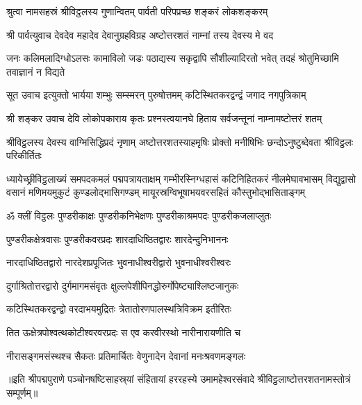
\twolineshloka
{श्रुत्वा नामसहस्रं श्रीविट्ठलस्य गुणान्वितम्}
{पार्वती परिपप्रच्छ शङ्करं लोकशङ्करम्}

{श्री पार्वत्युवाच}
\twolineshloka
{देवदेव महादेव देवानुग्रहविग्रह}
{अष्टोत्तरशतं नाम्नां तस्य देवस्य मे वद}

\threelineshloka
{जनः कलिमलादिग्धोऽलसः कामाविलो जडः}
{पठाद्यस्य सकृद्वापि सौशील्यादिरतो भवेत्}
{तदहं श्रोतुमिच्छामि तवाज्ञानं न विद्यते}

{सूत उवाच}
\twolineshloka
{इत्युक्तो भार्यया शम्भुः सम्स्मरन् पुरुषोत्तमम्}
{कटिस्थितकरद्वन्द्वं जगाद नगपुत्रिकाम्}

{श्री शङ्कर उवाच}
\twolineshloka
{देवि लोकोपकाराय कृतः प्रश्नस्त्वयानघे}
{हिताय सर्वजन्तूनां नाम्नामष्टोत्तरं शतम्}

\threelineshloka
{श्रीविट्ठलस्य देवस्य वाग्मिसिद्धिप्रदं नृणाम्}
{अष्टोत्तरशतस्याहमृषिः प्रोक्तो मनीषिभिः}
{छन्दोऽनुष्टुब्देवता श्रीविट्ठलः परिकीर्तितः}

\fourlineindentedshloka
{ध्यायेच्छ्रीविट्ठलाख्यं समपदकमलं पद्मपत्रायताक्षम्}
{गम्भीरस्निग्धहासं कटिनिहितकरं नीलमेघावभासम्}
{विद्युद्वासो वसानं मणिमयमुकुटं कुण्डलोद्भासिगण्डम्}
{मायूरस्रग्विभूषाभयवरसहितं कौस्तुभोद्भासिताङ्गम्}

\twolineshloka
{{ॐ क्लीं} विट्ठलः पुण्डरीकाक्षः पुण्डरीकनिभेक्षणः}
{पुण्डरीकाश्रमपदः पुण्डरीकजलाप्लुतः}

\twolineshloka
{पुण्डरीकक्षेत्रवासः पुण्डरीकवरप्रदः}
{शारदाधिष्ठितद्वारः शारदेन्दुनिभाननः}

\twolineshloka
{नारदाधिष्ठितद्वारो नारदेशप्रपूजितः}
{भुवनाधीश्वरीद्वारो भुवनाधीश्वरीश्वरः}

\twolineshloka
{दुर्गाश्रितोत्तरद्वारो दुर्गमागमसंवृतः}
{क्षुल्लपेशीपिनद्धोरुर्गोपेष्ट्याश्लिष्टजानुकः}

\twolineshloka
{कटिस्थितकरद्वन्द्वो वरदाभयमुद्रितः}
{त्रेतातोरणपालस्थत्रिविक्रम इतीरितः}

\twolineshloka
{तित ऊक्षेत्रपोश्वत्थकोटीश्वरवरप्रदः}
{स एव करवीरस्थो नारीनारायणीति च}

\twolineshloka
{नीरासङ्गमसंस्थश्च सैकतः प्रतिमार्चितः}
{वेणुनादेन देवानां मनःश्रवणमङ्गलः}

{॥इति श्रीपद्मपुराणे पञ्चोनषष्टिसाहस्र्यां संहितायां हररहस्ये उमामहेश्वरसंवादे श्रीविट्ठलाष्टोत्तरशतनामस्तोत्रं सम्पूर्णम्॥}